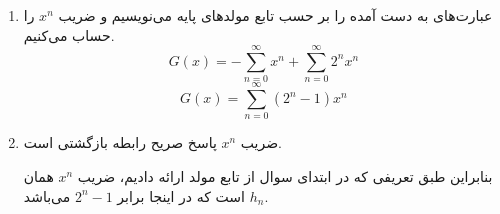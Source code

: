\begin{PROBLEM}
{\begin{enumerate}[label=\arabic*)]
            $$G(x) = \frac{-1}{1 - x} + \frac{1}{1 - 2x}$$
            \item عبارت‌های به دست آمده را بر حسب تابع مولد‌های پایه می‌نویسیم و ضریب $x^n$ را حساب می‌کنیم.
            $$G(x) = -\sum_{n = 0}^{\infty} x^n + \sum_{n = 0}^{\infty} 2^nx^n$$
            $$G(x) = \sum_{n = 0}^{\infty} (2^n - 1)x^n$$
            \item ضریب $x^n$ پاسخ صریح رابطه بازگشتی است.
            
            بنابراین
        طبق تعریفی که در ابتدای سوال از تابع مولد ارائه دادیم، ضریب $x^n$ همان $h_n$ است
        که در اینجا برابر
        $2^n - 1$
        می‌باشد.
    \end{enumerate}
    }
\end{PROBLEM}